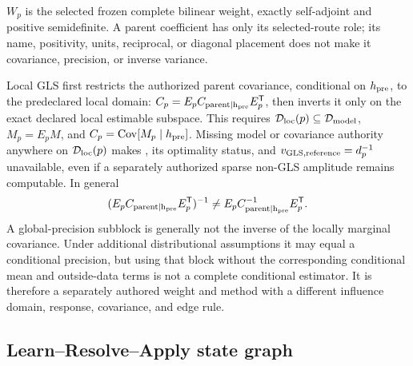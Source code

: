 $W_p$ is the selected frozen complete bilinear weight, exactly self-adjoint and
positive semidefinite. A parent coefficient has only its selected-route role;
its name, positivity, units, reciprocal, or diagonal placement does not make
it covariance, precision, or inverse variance.

Local GLS first restricts the authorized parent covariance, conditional on
$h_{\rm pre}$, to the predeclared local domain:
$C_p=E_pC_{\rm parent\mid h_{\rm pre}}E_p^{\mathsf T}$, then inverts it only on the exact
declared local estimable subspace. This requires
$\mathcal{D}_{\rm loc}(p)\subseteq\mathcal{D}_{\rm model}$,
$M_p=E_pM$, and
$C_p=\operatorname{Cov}[M_p\mid h_{\rm pre}]$. Missing model or covariance
authority anywhere on $\mathcal{D}_{\rm loc}(p)$ makes , its optimality
status, and $v_{{\rm GLS,reference}}=d_p^{-1}$ unavailable, even if a
separately authorized sparse non-GLS amplitude remains computable. In general
\[
 (E_pC_{\rm parent\mid h_{\rm pre}}E_p^{\mathsf T})^{-1}
 \ne E_pC_{\rm parent\mid h_{\rm pre}}^{-1}E_p^{\mathsf T}.
\]
A global-precision subblock is generally not the inverse of the locally
marginal covariance. Under additional distributional assumptions it may equal
a conditional precision, but using that block without the corresponding
conditional mean and outside-data terms is not a complete conditional
estimator. It is therefore a separately authored weight and method with a
different influence domain, response, covariance, and edge rule.

\subsection{Learn--Resolve--Apply state graph}
\label{sec:state-graph}

